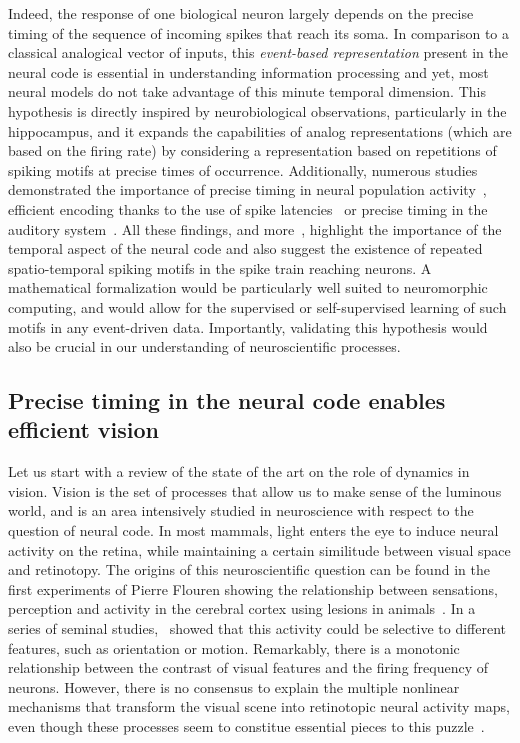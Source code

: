 \documentclass[brainsci, %
               review,submit,pdftex,moreauthors%
               ]{Definitions/mdpi}
\begin{document}
Indeed, the response of one biological neuron largely depends on the precise timing of the sequence of incoming spikes that reach its soma. In comparison to a classical analogical vector of inputs, this \emph{event-based representation} present in the neural code is essential in understanding information processing and yet, most neural models do not take advantage of this minute temporal dimension. This hypothesis is directly inspired by neurobiological observations, particularly in the hippocampus, and it expands the capabilities of analog representations (which are based on the firing rate) by considering a representation based on repetitions of spiking motifs at precise times of occurrence. 
Additionally, numerous studies demonstrated the importance of precise timing in neural population activity~\citep{davis_spontaneous_2021}, efficient encoding thanks to the use of spike latencies~\citep{perrinet_coding_2004,gollisch_rapid_2008} or precise timing in the auditory system~\citep{deweese_binary_2003,carr_circuit_1990}. All these findings, and more~\citep{bohte_evidence_2004}, highlight the importance of the temporal aspect of the neural code and also suggest the existence of repeated spatio-temporal spiking motifs in the spike train reaching neurons.  A mathematical formalization would be particularly well suited to neuromorphic computing, and would allow for the supervised or self-supervised learning of such motifs in any event-driven data.  Importantly, validating this hypothesis would also be crucial in our understanding of neuroscientific processes.
%
\subsection{Precise timing in the neural code enables efficient vision}
%
Let us start with a review of the state of the art on the role of dynamics in vision. Vision is the set of processes that allow us to make sense of the luminous world, and is an area intensively studied in neuroscience with respect to the question of neural code. In most mammals, light enters the eye to induce neural activity on the retina, while maintaining a certain similitude between visual space and retinotopy. The origins of this  neuroscientific question can be found in the first experiments of Pierre Flouren showing the relationship between sensations, perception and activity in the cerebral cortex using lesions in animals~\citep{pearce_marie-jean-pierre_2009}. In a series of seminal studies,~\citet{hubel_receptive_1968} showed that this activity could be selective to different features, such as orientation or motion. Remarkably, there is a monotonic relationship between the contrast of visual features and the firing frequency of neurons. However, there is no consensus to explain the multiple nonlinear mechanisms that transform the visual scene into retinotopic neural activity maps, even though these processes seem to constitue essential pieces to this puzzle~\citep{carandini_normalization_2012}. 
\end{document}
